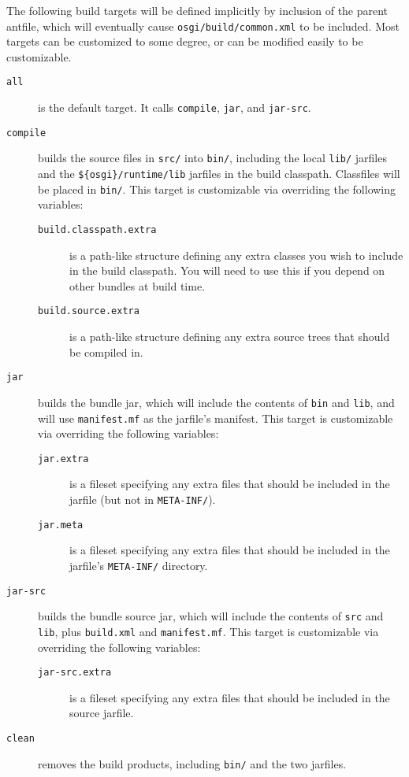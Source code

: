\documentclass{report}
\begin{document}
The following build targets will be defined implicitly by inclusion of the parent
antfile, which will eventually cause {\tt osgi/build/common.xml} to be included.
Most targets can be customized to some degree, or can be modified easily to be
customizable.

\begin{description}
\item[\tt all] is the default target. It calls {\tt compile}, {\tt jar}, and {\tt jar-src}.

\item[\tt compile] builds the source files in {\tt src/} into {\tt bin/}, 
including the local {\tt lib/} jarfiles and the {\tt \$\{osgi\}/runtime/lib} jarfiles 
in the build classpath. Classfiles will be placed in {\tt bin/}. This target is 
customizable via overriding the following variables:
	
	\begin{description}
	\item[\tt build.classpath.extra] is a path-like structure defining any extra 
	classes you wish to include in the build classpath. You will need to use this 
	if you depend on other bundles at build time.
	\item[\tt build.source.extra] is a path-like structure defining any extra 
	source trees that should be compiled in.	
	\end{description}

\item[\tt jar] builds the bundle jar, which will include the contents of {\tt bin}
and {\tt lib}, and will use {\tt manifest.mf} as the jarfile's manifest. This target is 
customizable via overriding the following variables:
	
	\begin{description}
	\item[\tt jar.extra] is a fileset specifying any extra files that should be
	included in the jarfile (but not in {\tt META-INF/}).
	\item[\tt jar.meta] is a fileset specifying any extra files that should be
	included in the jarfile's {\tt META-INF/} directory.
	\end{description}

\item[\tt jar-src] builds the bundle source jar, which will include the contents
of {\tt src} and {\tt lib},  plus {\tt build.xml} and {\tt manifest.mf}. This target is 
customizable via overriding the following variables:
	
	\begin{description}
	\item[\tt jar-src.extra] is a fileset specifying any extra files that should be
	included in the source jarfile.
	\end{description}

\item[\tt clean] removes the build products, including {\tt bin/} and the two
jarfiles.

\end{description}
\end{document}
